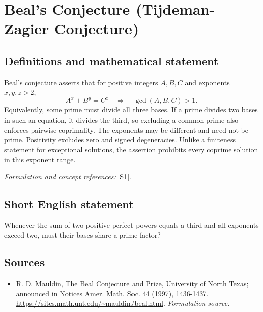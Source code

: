 \documentclass[11pt]{article}
\begin{document}
\section*{\texorpdfstring{Beal's Conjecture (Tijdeman-Zagier Conjecture)}{Beal's Conjecture (Tijdeman-Zagier Conjecture)}}\label{366}
\subsection{Definitions and mathematical statement}
Beal's conjecture asserts that for positive integers $A,B,C$ and exponents $x,y,z>2$,
\[
 A^x+B^y=C^z\quad\Longrightarrow\quad\gcd(A,B,C)>1.
\]
Equivalently, some prime must divide all three bases. If a prime divides two bases in such an equation, it divides the third, so excluding a common prime also enforces pairwise coprimality. The exponents may be different and need not be prime. Positivity excludes zero and signed degeneracies. Unlike a finiteness statement for exceptional solutions, the assertion prohibits every coprime solution in this exponent range.
\par\smallskip\textit{Formulation and concept references:} \href{https://sites.math.unt.edu/~mauldin/beal.html}{[S1]}.

\subsection{Short English statement}
Whenever the sum of two positive perfect powers equals a third and all exponents exceed two, must their bases share a prime factor?
\subsection{Sources}
\begin{itemize}
\item[S1]R. D. Mauldin, The Beal Conjecture and Prize, University of North Texas; announced in Notices Amer. Math. Soc. 44 (1997), 1436-1437.
\url{https://sites.math.unt.edu/~mauldin/beal.html}.
\textit{Formulation source.}
\end{itemize}
\end{document}
